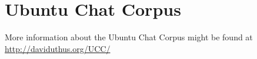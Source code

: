 \documentclass{article} %
\begin{document}


\section{Ubuntu Chat Corpus \label{sec:ubuntudata}}
More information about the Ubuntu Chat Corpus might be found at \url{http://daviduthus.org/UCC/}





\begin{comment}


















\noindent\makebox[\linewidth]{\rule{\paperwidth}{2pt}} \\%
\noindent\makebox[\linewidth]{\rule{\paperwidth}{2pt}} \\%
\noindent\makebox[\linewidth]{\rule{\paperwidth}{2pt}} \\%

GENERAL THINGS AND INFO FROM THE TEMPLATE AFTER HERE!!!! \\


\section{Submission of papers to NIPS 2014}

NIPS requires electronic submissions.  The electronic submission site is  
\begin{center}
   \url{http://papers.nips.cc}
\end{center}

Please read carefully the
instructions below, and follow them faithfully.
\subsection{Style}

Papers to be submitted to NIPS 2014 must be prepared according to the
instructions presented here. Papers may be only up to eight pages long,
including figures. Since 2009 an additional ninth page \textit{containing only
cited references} is allowed. Papers that exceed nine pages will not be
reviewed, or in any other way considered for presentation at the conference.


\end{comment}
\end{document}
